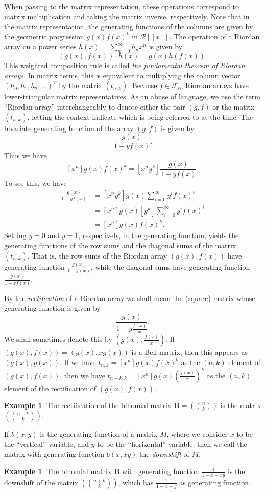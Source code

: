 \documentclass[12pt,reqno]{article}
\theoremstyle{definition}
\newtheorem{example}[theorem]{Example}
\begin{document}
When passing to the matrix representation, these operations correspond to matrix multiplication and taking the matrix inverse, respectively. Note that in the matrix representation, the generating functions of the columns are given by the geometric progression $g(x)f(x)^k$ in $\mathcal{R}[[x]]$. The operation of a Riordan array on a power series $h(x)=\sum_{n=0}^{\infty} h_n x^n$ is given by
$$ (g(x), f(x)) \cdot h(x) = g(x)h(f(x)).$$
This weighted composition rule is called \emph{the fundamental theorem of Riordan arrays}.
In matrix terms, this is equivalent to multiplying the column vector $(h_0, h_1, h_2,\ldots)^T$ by the matrix $(t_{n,k})$.
Because $f \in \mathcal{F}_0$, Riordan arrays have lower-triangular matrix representatives. As an abuse of language, we use the term ``Riordan array'' interchangeably to denote either the pair $(g, f)$ or the matrix $(t_{n,k})$, letting the context indicate which is being referred to at the time.
The bivariate generating function of the array $(g, f)$ is given by
$$\frac{g(x)}{1-y f(x)}.$$
Thus we have
$$[x^n] g(x)f(x)^k = [x^n y^k] \frac{g(x)}{1-y f(x)}.$$
To see this, we have
\begin{align*}
[x^n y^k]\frac{g(x)}{1-y f(x)} &=
[x^n y^k]  g(x) \sum_{i=0}^{\infty} y^i f(x)^i\\
&=[x^n] g(x) [y^k]\sum_{i=0}^{\infty} y^i f(x)^i \\
&=[x^n] g(x) f(x)^k.\end{align*}
Setting $y=0$ and $y=1$, respectively, in the generating function, yields the generating functions of the row sums and the diagonal sums of the matrix $(t_{n,k})$. That is, the row sums of the Riordan array $(g(x), f(x))$ have generating function $\frac{g(x)}{1-f(x)}$, while the diagonal sums have generating function $\frac{g(x)}{1-xf(x)}$.

By the \emph{rectification} of a Riordan array we shall mean the (square) matrix whose generating function is given by
$$\frac{g(x)}{1-y\frac{f(x)}{x}}.$$
We shall sometimes denote this by $\left(g(x), \frac{f(x)}{x}\right)$. If $(g(x), f(x))=(g(x),xg(x))$ is a Bell matrix, then this appears as $(g(x), g(x))$. If we have
$t_{n,k}=[x^n] g(x)f(x)^k$ as the $(n,k)$ element of $(g(x), f(x))$, then we have $t_{n+k,k}=[x^n]g(x)\left(\frac{f(x)}{x}\right)^k$ as the $(n,k)$ element of the rectification of $(g(x), f(x))$.
\begin{example} The rectification of the binomial matrix $\mathbf{B}=\left(\binom{n}{k}\right)$ is the matrix $\left(\binom{n+k}{k}\right)$.
\end{example}
If $b(x,y)$ is the generating function of a matrix $M$, where we consider $x$ to be the ``vertical'' variable, and $y$ to be the ``horizontal'' variable, then we call the matrix with generating function $b(x,xy)$ the \emph{downshift} of $M$. 
\begin{example} The binomial matrix $\mathbf{B}$ with generating function $\frac{1}{1-x-xy}$ is the downshift of the matrix $(\binom{n+k}{k})$, which has $\frac{1}{1-x-y}$ as generating function.
\end{example}
\end{document}
